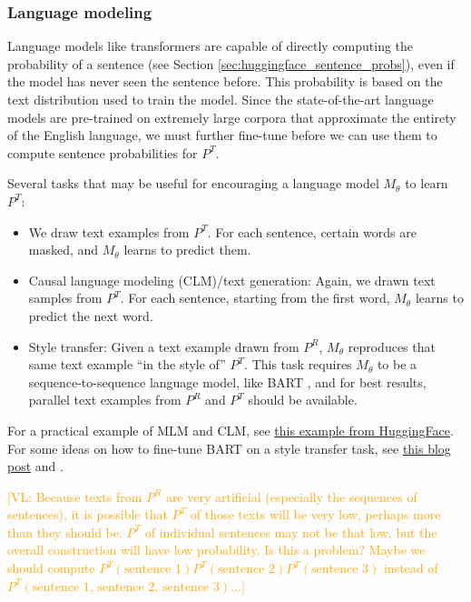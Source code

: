 \documentclass{article}
\newcommand{\vl}[1]{\textcolor{orange}{[VL: #1]}}
\begin{document}
\subsubsection{Language modeling}
\label{sec:language_modeling}

Language models like transformers are capable of directly computing the probability of a sentence (see Section \ref{sec:huggingface_sentence_probs}), even if the model has never seen the sentence before. This probability is based on the text distribution used to train the model. Since the state-of-the-art language models are pre-trained on extremely large corpora that approximate the entirety of the English language, we must further fine-tune before we can use them to compute sentence probabilities for $P^T$.

Several tasks that may be useful for encouraging a language model $M_\theta$ to learn $P^T$:
\begin{itemize}
    \item We draw text examples from $P^T$. For each sentence, certain words are masked, and $M_\theta$ learns to predict them.
    \item Causal language modeling (CLM)/text generation: Again, we drawn text samples from $P^T$. For each sentence, starting from the first word, $M_\theta$ learns to predict the next word.
    \item Style transfer: Given a text example drawn from $P^R$, $M_\theta$ reproduces that same text example ``in the style of'' $P^T$. This task requires $M_\theta$ to be a sequence-to-sequence language model, like BART \cite{lewis2020bart}, and for best results, parallel text examples from $P^R$ and $P^T$ should be available.
\end{itemize}

For a practical example of MLM and CLM, see \href{https://huggingface.co/docs/transformers/tasks/language_modeling}{this example from HuggingFace}. For some ideas on how to fine-tune BART on a style transfer task, see \href{https://blog.fastforwardlabs.com/2022/05/05/neutralizing-subjectivity-bias-with-huggingface-transformers.html}{this blog post} and \cite{lai2021bart}.

\vl{Because texts from $P^R$ are very artificial (especially the sequences of sentences), it is possible that $P^T$ of those texts will be very low, perhaps more than they should be. $P^T$ of individual sentences may not be that low, but the overall construction will have low probability. Is this a problem? Maybe we should compute $P^T(\text{sentence 1})P^T(\text{sentence 2})P^T(\text{sentence 3})$ instead of $P^T(\text{sentence 1, sentence 2, sentence 3})$...}
\end{document}
